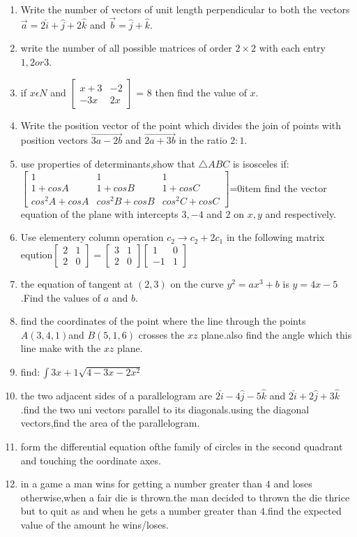 \documentclass[12pt,-letter paper]{article}
\providecommand{\myvec}[1]{\ensuremath{\begin{bmatrix}#1\end{bmatrix}}}
\begin{document}
\begin{enumerate}
    \item Write the number of vectors of unit length perpendicular to both the vectors $\overrightarrow{a} = 2\hat{i} + \hat{j} + 2\hat{k}$ and $\overrightarrow{b} = \hat{j} + \hat{k}$.
\item write the number of all possible matrices of order \(2\times2\) with each entry $1,2 or 3$.
\item if $x \epsilon  N$  and $\myvec{x+3 & -2 \\ -3x & 2x }$ = 8   then   find  the  value  of $ x$.
\item Write the position vector of the point which divides the join of points with position vectors \( \overrightarrow{3a - 2b} \) and \( \overrightarrow{2a + 3b} \) in the ratio \( 2:1 \).	
\item use properties of determinants,show that $\triangle{ABC}$ is isosceles if:\\
$\myvec{1&1&1\\1+cos{A}&1+cos{B}&1+cos{C}\\cos^2{A}+cos{A}&cos^2{B}+cos{B}&cos^2{C}+cos{C}}$=0item find the vector equation of the plane with intercepts $3,-4$ and $2$ on $x,y$ and respectively.
\item Use elementery column operation $c_{2} \rightarrow c_{2}+2c_{1}$ in the following matrix eqution$\myvec{2 & 1 \\ 2 & 0}=\myvec{3 & 1 \\ 2 & 0}\myvec{1 & 0 \\ -1 & 1}$
\item the equation of tangent at $(2,3)$ on the curve $y^2=ax^3+b$ is $y=4x-5$.Find the values of $a$ and $b$.
\item find the coordinates of the point where the line through the points $ A(3,4,1) $and $B(5,1,6)$ crosses the $xz$ plane.also find the angle  which this line make with the $xz$ plane.
\item find$:\int {3x+1}\sqrt {4-3x-2x^2}$
\item the two adjacent sides of a parallelogram are  $ 2\hat{i}-4\hat{j}-5\hat{k} $ and $2\hat{i}+2\hat{j}+3\hat{k} $.find the two uni vectors parallel to its diagonals.using the diagonal vectors,find the area of the parallelogram.	
\item form the differential equation ofthe family of circles in the second quadrant and touching the oordinate axes.
\item in a game a man wins    for getting a number greater than $4$ and loses    otherwise,when a fair die is thrown.the man decided to thrown the die thrice but to quit as and when he gets a number greater than $4$.find the expected value of the amount he wins/loses.

\end{enumerate}
\end{document}
